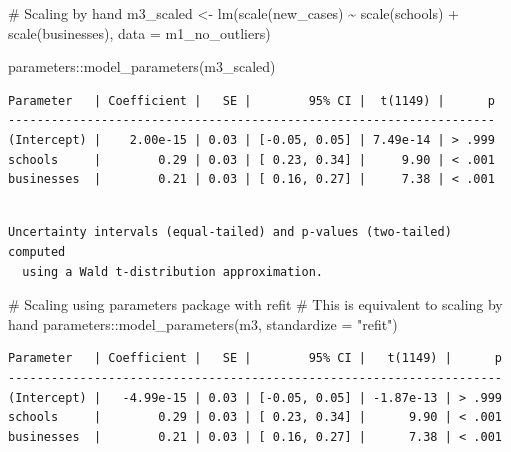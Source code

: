 \documentclass[
  letterpaper,
]{krantz}
\makeatletter
\newenvironment{Shaded}{\begin{snugshade}}{\end{snugshade}}
\newcommand{\AttributeTok}[1]{\textcolor[rgb]{0.40,0.45,0.13}{#1}}
\newcommand{\CommentTok}[1]{\textcolor[rgb]{0.37,0.37,0.37}{#1}}
\newcommand{\FunctionTok}[1]{\textcolor[rgb]{0.28,0.35,0.67}{#1}}
\newcommand{\NormalTok}[1]{\textcolor[rgb]{0.00,0.23,0.31}{#1}}
\newcommand{\OtherTok}[1]{\textcolor[rgb]{0.00,0.23,0.31}{#1}}
\newcommand{\SpecialCharTok}[1]{\textcolor[rgb]{0.37,0.37,0.37}{#1}}
\newcommand{\StringTok}[1]{\textcolor[rgb]{0.13,0.47,0.30}{#1}}
\newenvironment{kframe}{%
\medskip{}
\setlength{\fboxsep}{.8em}
 \def\at@end@of@kframe{}%
 \ifinner\ifhmode%
  \def\at@end@of@kframe{\end{minipage}}%
  \begin{minipage}{\columnwidth}%
 \fi\fi%
 \def\FrameCommand##1{\hskip\@totalleftmargin \hskip-\fboxsep
 \colorbox{shadecolor}{##1}\hskip-\fboxsep
     \hskip-\linewidth \hskip-\@totalleftmargin \hskip\columnwidth}%
 \MakeFramed {\advance\hsize-\width
   \@totalleftmargin\z@ \linewidth\hsize
   \@setminipage}}%
 {\par\unskip\endMakeFramed%
 \at@end@of@kframe}
\renewenvironment{Shaded}{\begin{kframe}}{\end{kframe}}
\makeatother
\begin{document}
\begin{Shaded}
\begin{Highlighting}[]
\CommentTok{\# Scaling \textquotesingle{}by hand\textquotesingle{}}
\NormalTok{m3\_scaled }\OtherTok{\textless{}{-}} \FunctionTok{lm}\NormalTok{(}\FunctionTok{scale}\NormalTok{(new\_cases) }\SpecialCharTok{\textasciitilde{}}
                  \FunctionTok{scale}\NormalTok{(schools) }\SpecialCharTok{+}
                  \FunctionTok{scale}\NormalTok{(businesses),}
                \AttributeTok{data =}\NormalTok{ m1\_no\_outliers)}

\NormalTok{parameters}\SpecialCharTok{::}\FunctionTok{model\_parameters}\NormalTok{(m3\_scaled)}
\end{Highlighting}
\end{Shaded}

\begin{verbatim}
Parameter   | Coefficient |   SE |        95% CI |  t(1149) |      p
--------------------------------------------------------------------
(Intercept) |    2.00e-15 | 0.03 | [-0.05, 0.05] | 7.49e-14 | > .999
schools     |        0.29 | 0.03 | [ 0.23, 0.34] |     9.90 | < .001
businesses  |        0.21 | 0.03 | [ 0.16, 0.27] |     7.38 | < .001
\end{verbatim}

\begin{verbatim}

Uncertainty intervals (equal-tailed) and p-values (two-tailed) computed
  using a Wald t-distribution approximation.
\end{verbatim}

\begin{Shaded}
\begin{Highlighting}[]
\CommentTok{\# Scaling using \textquotesingle{}parameters\textquotesingle{} package with refit}
\CommentTok{\# This is equivalent to scaling \textquotesingle{}by hand\textquotesingle{}}
\NormalTok{parameters}\SpecialCharTok{::}\FunctionTok{model\_parameters}\NormalTok{(m3, }\AttributeTok{standardize =} \StringTok{"refit"}\NormalTok{)}
\end{Highlighting}
\end{Shaded}

\begin{verbatim}
Parameter   | Coefficient |   SE |        95% CI |   t(1149) |      p
---------------------------------------------------------------------
(Intercept) |   -4.99e-15 | 0.03 | [-0.05, 0.05] | -1.87e-13 | > .999
schools     |        0.29 | 0.03 | [ 0.23, 0.34] |      9.90 | < .001
businesses  |        0.21 | 0.03 | [ 0.16, 0.27] |      7.38 | < .001
\end{verbatim}
\end{document}
